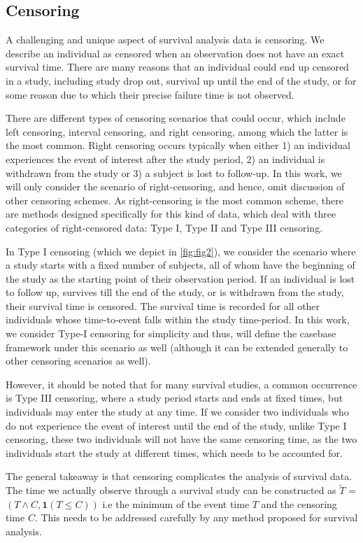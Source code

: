 \subsection{Censoring}

A challenging and unique aspect of survival analysis data is censoring. We describe an individual as censored when an observation does not have an exact survival time. There are many reasons that an individual could end up censored in a study, including study drop out, survival up until the end of the study, or for some reason due to which their precise failure time is not observed. 

There are different types of censoring scenarios that could occur, which include left censoring, interval censoring, and right censoring, among which the latter is the most common. Right censoring occurs typically when either 1) an individual experiences the event of interest after the study period, 2) an individual is withdrawn from the study or 3) a subject is lost to follow-up. In this work, we will only consider the scenario of right-censoring, and hence, omit discussion of other censoring schemes. As right-censoring is the most common scheme, there are methods designed specifically for this kind of data, which deal with three categories of right-censored data: Type I, Type II and Type III censoring. 
\smallskip \par
In Type I censoring (which we depict in \autoref{fig:fig2}), we consider the scenario where a study starts with a fixed number of subjects, all of whom have the beginning of the study as the starting point of their observation period. If an individual is lost to follow up, survives till the end of the study, or is withdrawn from the study, their survival time is censored. The survival time is recorded for all other individuals whose time-to-event falls within the study time-period. In this work, we consider Type-I censoring for simplicity and thus, will define the casebase framework under this scenario as well (although it can be extended generally to other censoring scenarios as well). 
\smallskip \par
However, it should be noted that for many survival studies, a common occurrence is Type III censoring, where a study period starts and ends at fixed times, but individuals may enter the study at any time. If we consider two individuals who do not experience the event of interest until the end of the study, unlike Type I censoring, these two individuals will not have the same censoring time, as the two individuals start the study at different times, which needs to be accounted for. 
\smallskip \par
The general takeaway is that censoring complicates the analysis of survival data. The time we actually observe through a survival study can be constructed as $\tilde{T}$ = $(T \wedge C, \textbf{1}(T \leq C))$ i.e the minimum of the event time $T$ and the censoring time $C$. This needs to be addressed carefully by any method proposed for survival analysis.

